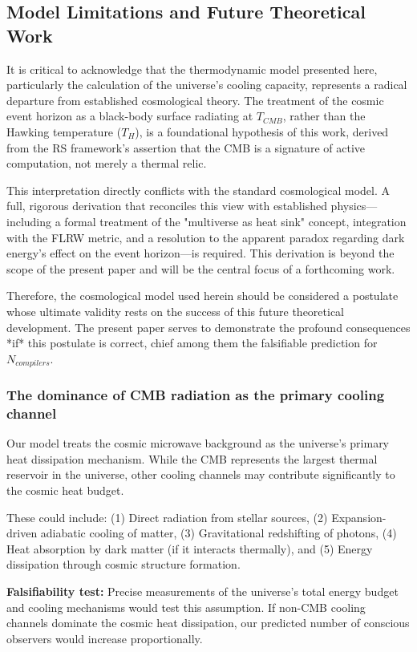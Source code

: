 \documentclass[11pt,a4paper]{article}
\theoremstyle{definition}
\theoremstyle{remark}
\begin{document}
\subsection{Model Limitations and Future Theoretical Work}

It is critical to acknowledge that the thermodynamic model presented here, particularly the calculation of the universe's cooling capacity, represents a radical departure from established cosmological theory. The treatment of the cosmic event horizon as a black-body surface radiating at \(T_{CMB}\), rather than the Hawking temperature (\(T_H\)), is a foundational hypothesis of this work, derived from the RS framework's assertion that the CMB is a signature of active computation, not merely a thermal relic.

This interpretation directly conflicts with the standard cosmological model. A full, rigorous derivation that reconciles this view with established physics—including a formal treatment of the "multiverse as heat sink" concept, integration with the FLRW metric, and a resolution to the apparent paradox regarding dark energy's effect on the event horizon—is required. This derivation is beyond the scope of the present paper and will be the central focus of a forthcoming work.

Therefore, the cosmological model used herein should be considered a postulate whose ultimate validity rests on the success of this future theoretical development. The present paper serves to demonstrate the profound consequences *if* this postulate is correct, chief among them the falsifiable prediction for \(N_{compilers}\).

\subsubsection{The dominance of CMB radiation as the primary cooling channel}

Our model treats the cosmic microwave background as the universe's primary heat dissipation mechanism. While the CMB represents the largest thermal reservoir in the universe, other cooling channels may contribute significantly to the cosmic heat budget.

These could include: (1) Direct radiation from stellar sources, (2) Expansion-driven adiabatic cooling of matter, (3) Gravitational redshifting of photons, (4) Heat absorption by dark matter (if it interacts thermally), and (5) Energy dissipation through cosmic structure formation.

\textbf{Falsifiability test:} Precise measurements of the universe's total energy budget and cooling mechanisms would test this assumption. If non-CMB cooling channels dominate the cosmic heat dissipation, our predicted number of conscious observers would increase proportionally.
\end{document}

